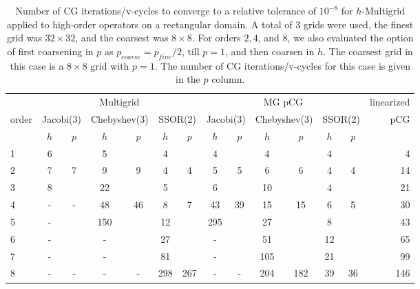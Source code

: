 \begin{table}
  \caption{\label{tab:box} Number of CG iterations/v-cycles to converge to a relative tolerance of $10^{-8}$ for $h$-Multigrid applied to high-order operators on a rectangular domain. A total of 3 grids were used, the finest grid was $32\times 32$, and the coarsest was $8\times 8$. For orders $2,4$, and $8$, we also evaluated the option of first coarsening in $p$ as $p_{coarse} = p_{fine}/2$, till $p=1$, and then coarsen in $h$. The coarsest grid in this case is a $8\times 8$ grid with $p=1$. The number of CG iterations/v-cycles for this case is given in the $p$ column.}
		\centering
    \begin{tabular}{|l|c|c|c|c|c|c|c|c|c|c|c|c|r|} 
\hline
                     & \multicolumn{6}{c|}{Multigrid} & \multicolumn{6}{c|}{MG pCG} &          linearized \\
										 \cline{2-13}
			order &  \multicolumn{2}{c|}{\scriptsize  Jacobi(3)} &  \multicolumn{2}{c|}{\scriptsize Chebyshev(3)} & \multicolumn{2}{c|}{\scriptsize  SSOR(2)} & \multicolumn{2}{c|}{\scriptsize Jacobi(3)} &  \multicolumn{2}{c|}{\scriptsize Chebyshev(3)} & \multicolumn{2}{c|}{\scriptsize SSOR(2)} & pCG\\
\hline
 & $h$ & $p$ & $h$ & $p$& $h$ & $p$& $h$ & $p$& $h$ & $p$& $h$ & $p$& \\
 \cline{2-13}
                   1 &       6 &    &                         5 &    &                 4 &   &                    4 &     &                      4 &      &               4 &   &    4\\
                   2 &   7     & 7  &                         9 & 9  &                 4 & 4 &                    5 &  5  &                      6 &  6   &               4 & 4 &   14\\
                   3 &       8 &    &                        22 &    &                 5 &   &                    6 &     &                     10 &      &               4 &   &   21\\
                   4 &       - & -  &                        48 & 46 &                 8 & 7 &                   43 & 39  &                     15 &  15  &               6 & 5 &   30\\
                   5 &       - &    &                       150 &    &                12 &   &                  295 &     &                     27 &      &               8 &   &   43\\
                   6 &       - &    &                         - &    &                27 &   &                    - &     &                     51 &      &              12 &   &   65\\
                   7 &       - &    &                         - &    &                81 &   &                    - &     &                    105 &      &              21 &   &   99\\
                   8 &       - & -  &                         - & -  &                298&267&                    - &  -  &                    204 &  182 &              39 &36 &  146\\
\hline
	  \end{tabular}
\end{table}


